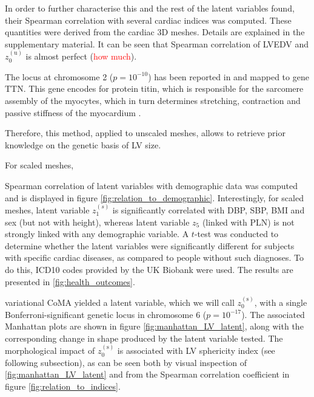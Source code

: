 In order to further characterise this and the rest of the latent variables found, their Spearman correlation with several cardiac indices was computed. These quantities were derived from the cardiac 3D meshes. Details are explained in the supplementary material. It can be seen that Spearman correlation of LVEDV and $z_0^{(\text{u})}$ is almost perfect (\textcolor{red}{how much}).

The locus at chromosome 2 ($p=10^{-10}$) has been reported in  \cite{ref_nayaung, ref_pirruccello} and mapped to gene TTN. This gene encodes for protein titin, which is  responsible  for  the  sarcomere  assembly of the myocytes, which in turn determines stretching, contraction and passive stiffness of the myocardium \cite{granzier_giant_2004}.

Therefore, this method, applied to unscaled meshes, allows to retrieve prior knowledge on the genetic basis of LV size.

For scaled meshes, 

Spearman correlation of latent variables with demographic data was computed and is displayed in figure \ref{fig:relation_to_demographic}.
Interestingly, for scaled meshes, latent variable $z_1^{(s)}$ is significantly correlated with DBP, SBP, BMI and sex (but not with height), whereas latent variable $z_5$ (linked with PLN) is not strongly linked with any demographic variable.
A $t$-test was conducted to determine whether the latent variables were significantly different for subjects with specific cardiac diseases, as compared to people without such diagnoses. To do this, ICD10 codes provided by the UK Biobank were used. The results are presented in \ref{fig:health_outcomes}.


variational CoMA yielded a latent variable, which we will call $z_0^{(\text{s})}$, with a single Bonferroni-significant genetic locus in chromosome 6 ($p=10^{-17}$). The associated Manhattan plots are shown in figure \ref{fig:manhattan_LV_latent}, along with the corresponding change in shape produced by the latent variable tested. The morphological impact of $z_0^{(\text{s})}$ is associated with LV sphericity index (see following subsection), as can be seen both by visual inspection of \ref{fig:manhattan_LV_latent} and from the Spearman correlation coefficient in figure \ref{fig:relation_to_indices}.

